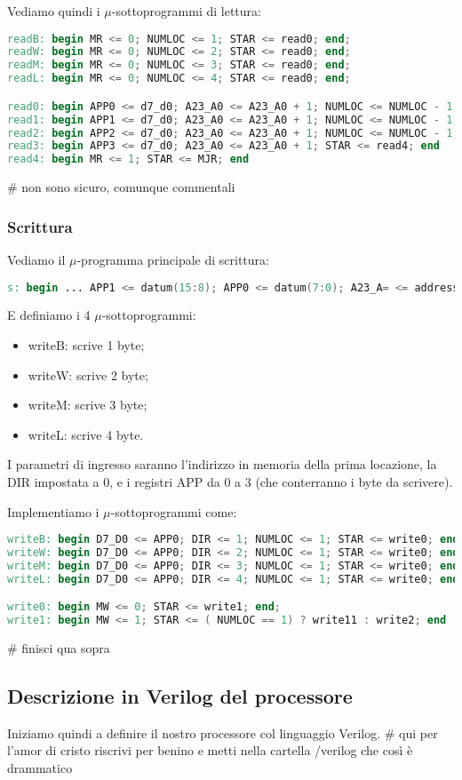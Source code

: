 \documentclass[a4paper,11pt]{article}
\begin{document}
Vediamo quindi i $\mu$-sottoprogrammi di lettura:
\begin{lstlisting}[language=verilog, style=codestyle]	
readB: begin MR <= 0; NUMLOC <= 1; STAR <= read0; end;
readW: begin MR <= 0; NUMLOC <= 2; STAR <= read0; end;
readM: begin MR <= 0; NUMLOC <= 3; STAR <= read0; end;
readL: begin MR <= 0; NUMLOC <= 4; STAR <= read0; end;

read0: begin APP0 <= d7_d0; A23_A0 <= A23_A0 + 1; NUMLOC <= NUMLOC - 1; STAR <= ( NUMLOC == 1 ) ? read4 : read1; end
read1: begin APP1 <= d7_d0; A23_A0 <= A23_A0 + 1; NUMLOC <= NUMLOC - 1; STAR <= ( NUMLOC == 1 ) ? read4 : read2; end
read2: begin APP2 <= d7_d0; A23_A0 <= A23_A0 + 1; NUMLOC <= NUMLOC - 1; STAR <= ( NUMLOC == 1 ) ? read4 : read3; end
read3: begin APP3 <= d7_d0; A23_A0 <= A23_A0 + 1; STAR <= read4; end
read4: begin MR <= 1; STAR <= MJR; end
\end{lstlisting}

# non sono sicuro, comunque commentali

\subsubsection{Scrittura}
Vediamo il $\mu$-programma principale di scrittura:
\begin{lstlisting}[language=verilog, style=codestyle]	
s: begin ... APP1 <= datum(15:8); APP0 <= datum(7:0); A23_A= <= address; MJR = s_x+1; STAR <= subprogram; end
\end{lstlisting}

E definiamo i 4 $\mu$-sottoprogrammi:
\begin{itemize}
	\item writeB: scrive 1 byte;
	\item writeW: scrive 2 byte;
	\item writeM: scrive 3 byte;
	\item writeL: scrive 4 byte.
\end{itemize}

I parametri di ingresso saranno l'indirizzo in memoria della prima locazione, la DIR impostata a 0, e i registri APP da 0 a 3 (che conterranno i byte da scrivere).

Implementiamo i $\mu$-sottoprogrammi come:
\begin{lstlisting}[language=verilog, style=codestyle]	
writeB: begin D7_D0 <= APP0; DIR <= 1; NUMLOC <= 1; STAR <= write0; end 
writeW: begin D7_D0 <= APP0; DIR <= 2; NUMLOC <= 1; STAR <= write0; end
writeM: begin D7_D0 <= APP0; DIR <= 3; NUMLOC <= 1; STAR <= write0; end
writeL: begin D7_D0 <= APP0; DIR <= 4; NUMLOC <= 1; STAR <= write0; end

write0: begin MW <= 0; STAR <= write1; end;
write1: begin MW <= 1; STAR <= ( NUMLOC == 1) ? write11 : write2; end
\end{lstlisting}
# finisci qua sopra

\subsection{Descrizione in Verilog del processore}
Iniziamo quindi a definire il nostro processore col linguaggio Verilog.
# qui per l'amor di cristo riscrivi per benino e metti nella cartella /verilog che così è drammatico
\end{document}
